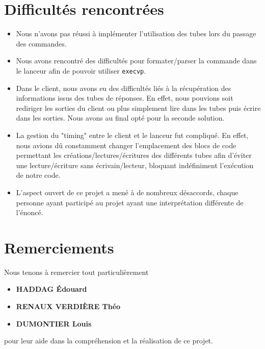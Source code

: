 \documentclass[12pt]{article}
\begin{document}
    \section{Difficultés rencontrées}
    \begin{itemize}
        \item Nous n'avons pas réussi à implémenter l'utilisation des tubes lors du passage
        des commandes.
        \item Nous avons rencontré des difficultés pour formater/parser la commande dans le lanceur
        afin de pouvoir utiliser \texttt{execvp}.
        \item Dans le client, nous avons eu des difficultés liés à la récupération des
        informations issus des tubes de réponses. En effet, nous pouvions soit rediriger les sorties du client ou plus simplement lire dans les tubes puis écrire dans les sorties. Nous avons au final opté pour la seconde solution.
        \item La gestion du "timing" entre le client et le lanceur fut compliqué. En effet, nous avions dû constamment changer l'emplacement des blocs de code permettant les créations/lectures/écritures des différents tubes afin d'éviter une lecture/écriture sans écrivain/lecteur, bloquant indéfiniment l'exécution de notre code.
        \item L'aspect ouvert de ce projet a mené à de nombreux désaccords, chaque personne ayant participé au projet ayant une interprétation différente de l'énoncé.
    \end{itemize}


    \section{Remerciements}
    Nous tenons à remercier tout particulièrement \begin{itemize}
                                                      \item \textbf{HADDAG Édouard}
                                                      \item \textbf{RENAUX VERDIÈRE Théo}
                                                      \item \textbf{DUMONTIER Louis}
    \end{itemize} pour leur aide dans la compréhension et la réalisation de ce projet.
\end{document}
